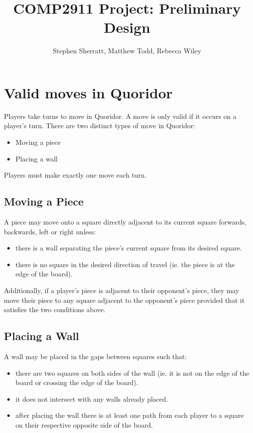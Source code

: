 \documentclass[a4paper]{article}
\title{COMP2911 Project: Preliminary Design}
\author{Stephen Sherratt, Matthew Todd, Rebecca Wiley}
\begin{document}
\maketitle

\section{Valid moves in Quoridor}

Players take turns to move in Quoridor.
A move is only valid if it occurs on a player's turn.
There are two distinct types of move in Quoridor: 

\begin{itemize}
\item Moving a piece
\item Placing a wall
\end{itemize}

Players must make exactly one move each turn.

    \subsection{Moving a Piece}
    
    A piece may move onto a square directly adjacent to its current square 
        forwards, backwards, left or right unless:
    \begin{itemize}
    \item there is a wall separating the piece's current square from its desired square.
    \item there is no square in the desired direction of travel 
        (ie. the piece is at the edge of the board).
    \end{itemize}
    
    Additionally, if a player's piece is adjacent to their opponent's piece, they
        may move their piece to any square adjacent to the opponent's piece provided that
        it satisfies the two conditions above.

    \subsection{Placing a Wall}

    A wall may be placed in the gaps between squares such that:

    \begin{itemize}
    \item there are two squares on both sides of the wall 
        (ie. it is not on the edge of the board or crossing the edge of the board).
    \item it does not intersect with any walls already placed.
    \item after placing the wall there is at least one path from each player 
        to a square on their respective opposite side of the board.
    \end{itemize}
\end{document}
